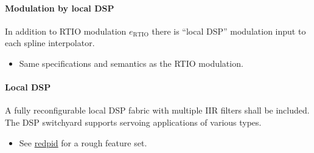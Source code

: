 \documentclass[english]{article}
\begin{document}
\paragraph{Modulation by local DSP}
In addition to RTIO modulation $e_\mathrm{RTIO}$ there is ``local DSP'' modulation
input to each spline interpolator.

\begin{itemize}
	\item Same specifications and semantics as the RTIO modulation.
\end{itemize}

\paragraph{Local DSP}
A fully reconfigurable local DSP fabric with multiple IIR filters shall be
included. The DSP switchyard supports servoing applications of various types.
\begin{itemize}
	\item See \href{https://github.com/jordens/redpid}{redpid} for a rough
		feature set.
\end{itemize}
\end{document}
